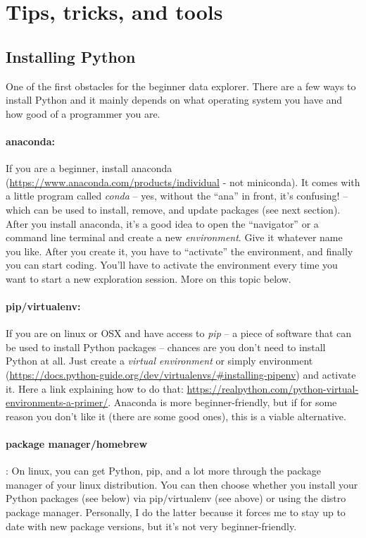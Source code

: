 \documentclass[12pt,a4paper,notitlepage,onecolumn]{article}
\begin{document}
\newpage
\section{Tips, tricks, and tools} \label{sec:tips}

\subsection{Installing Python}
One of the first obstacles for the beginner data explorer. There are a few ways to install Python and it mainly depends on what operating system you have and how good of a programmer you are.

\paragraph{anaconda:} If you are a beginner, install anaconda (\url{https://www.anaconda.com/products/individual} - not miniconda). It comes with a little program called \textit{conda} -- yes, without the ``ana'' in front, it's confusing! -- which can be used to install, remove, and update packages (see next section). After you install anaconda, it's a good idea to open the ``navigator'' or a command line terminal and create a new \textit{environment}. Give it whatever name you like. After you create it, you have to ``activate'' the environment, and finally you can start coding. You'll have to activate the environment every time you want to start a new exploration session. More on this topic below.

\paragraph{pip/virtualenv:} If you are on linux or OSX and have access to \textit{pip} -- a piece of software that can be used to install Python packages -- chances are you don't need to install Python at all. Just create a \textit{virtual environment} or simply environment (\url{https://docs.python-guide.org/dev/virtualenvs/#installing-pipenv}) and activate it. Here a link explaining how to do that: \url{https://realpython.com/python-virtual-environments-a-primer/}. Anaconda is more beginner-friendly, but if for some reason you don't like it (there are some good ones), this is a viable alternative.

\paragraph{package manager/homebrew}: On linux, you can get Python, pip, and a lot more through the package manager of your linux distribution. You can then choose whether you install your Python packages (see below) via pip/virtualenv (see above) or using the distro package manager. Personally, I do the latter because it forces me to stay up to date with new package versions, but it's not very beginner-friendly.
\end{document}
